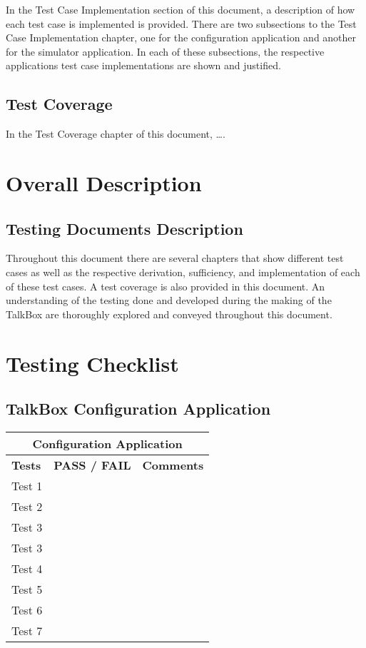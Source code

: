 In the Test Case Implementation section of this document, a description of how each test case is implemented is provided. There are two subsections to the Test Case Implementation chapter, one for the configuration application and another for the simulator application. In each of these subsections, the respective applications test case implementations are shown and justified.


\section{Test Coverage}

In the Test Coverage chapter of this document, ….


\chapter{Overall Description}
\label{Overall Description}

\section{Testing Documents Description}

Throughout this document there are several chapters that show different test cases as well as the respective derivation, sufficiency, and implementation of each of these test cases. A test coverage is also provided in this document. An understanding of the testing done and developed during the making of the TalkBox are thoroughly explored and conveyed throughout this document. 

\newpage

\chapter{Testing Checklist}
\label{External Interface Requirements}

\section{TalkBox Configuration Application}

 
\setlength{\arrayrulewidth}{0.3mm}
\setlength{\tabcolsep}{18pt}
\renewcommand{\arraystretch}{3.5}
 
\begin{tabular}{ |p{5cm}|p{1.5cm}|p{5cm}|  }
\hline
\multicolumn{3}{|c|}{\textbf{Configuration Application}} \\
\hline
\textbf{Tests} & \textbf{PASS / FAIL} & \textbf{Comments} \\
\hline
Test 1 &  & \\
\hline
Test 2 &    &  \\
\hline
Test 3 & &  \\
\hline
Test 3    & &  \\
\hline
Test 4 &  &  \\
\hline
Test 5 &  &    \\
\hline
Test 6 &  &   \\
\hline
Test 7 & & \\
\hline
\end{tabular}


